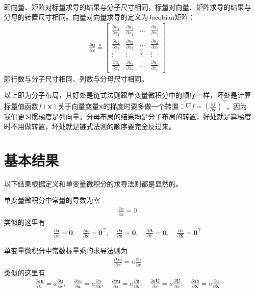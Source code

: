 \documentclass{ctexart}
\newcommand{\blue}[1]{\textcolor{Solarized-blue}{#1}}
\theoremstyle{definition}
\def \zerov {\bm{0}}
\def \av {\bm{a}}
\def \uv {\bm{u}}
\def \xv {\bm{x}}
\def \Av {\mathbf{A}}
\def \Uv {\mathbf{U}}
\def \Xv {\mathbf{X}}
\begin{document}
即向量、矩阵对标量求导的结果\blue{与分子尺寸相同}，标量对向量、矩阵求导的结果\blue{与分母的转置尺寸相同}。向量对向量求导的定义为Jacobian矩阵：
\begin{align*}
    \frac{\partial \uv}{\partial \xv} \triangleq \begin{bmatrix}
        \frac{\partial u_1}{\partial x_1} & \frac{\partial u_1}{\partial x_2} & \ldots & \frac{\partial u_1}{\partial x_l} \\
        \frac{\partial u_2}{\partial x_1} & \frac{\partial u_2}{\partial x_2} & \ldots & \frac{\partial u_2}{\partial x_l} \\
        \vdots                            & \vdots                            & \ddots & \vdots                            \\
        \frac{\partial u_l}{\partial x_1} & \frac{\partial u_l}{\partial x_2} & \ldots & \frac{\partial u_l}{\partial x_l}
    \end{bmatrix}
\end{align*}
即\blue{行数与分子尺寸相同}、\blue{列数与分母尺寸相同}。

以上即为\blue{分子布局}，其好处是链式法则跟单变量微积分中的顺序一样，坏处是计算标量值函数$f(\xv)$关于向量变量$\xv$的梯度时要多做一个转置：$\nabla f = (\frac{\partial f}{\partial \xv})^\top$，因为我们更习惯梯度是列向量。分母布局的结果均是分子布局的转置，好处就是算梯度时不用做转置，坏处就是链式法则的顺序要完全反过来。

\section{基本结果}

以下结果根据定义和单变量微积分的求导法则都是显然的。

单变量微积分中\blue{常量的导数为零}
\begin{align*}
    \frac{\partial a}{\partial x} = 0
\end{align*}
类似的这里有
\begin{align*}
    \frac{\partial \av}{\partial x} = \zerov, \quad \frac{\partial a}{\partial \xv} = \zerov^\top, \quad \frac{\partial \av}{\partial \xv} = \zerov, \quad \frac{\partial \Av}{\partial x} = \zerov, \quad \frac{\partial a}{\partial \Xv} = \zerov^\top
\end{align*}

单变量微积分中\blue{常数标量乘}的求导法则为
\begin{align*}
    \frac{\partial a u}{\partial x} = a \frac{\partial u}{\partial x}
\end{align*}
类似的这里有
\begin{align*}
    \frac{\partial a \uv}{\partial x} = a \frac{\partial \uv}{\partial x}, \quad \frac{\partial a u}{\partial \xv} = a \frac{\partial u}{\partial \xv}, \quad \frac{\partial a \uv}{\partial \xv} = a \frac{\partial \uv}{\partial \xv}, \quad \frac{\partial a \Uv}{\partial x} = a \frac{\partial \Uv}{\partial x}, \quad \frac{\partial a u}{\partial \Xv} = a \frac{\partial u}{\partial \Xv}
\end{align*}
\end{document}
